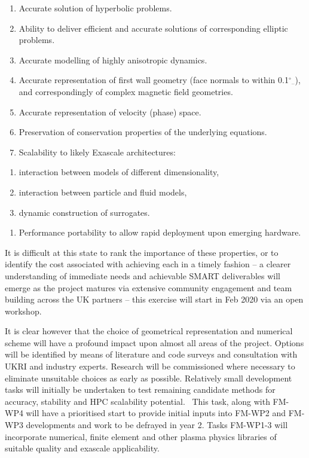 \documentclass[a4paper]{article}
\newcommand\textsubscript[1]{\ensuremath{_{\text{#1}}}}
\newcommand\liststyleWWNumviii{%
\renewcommand\theenumi{\arabic{enumi}}
\renewcommand\theenumii{\arabic{enumii}}
\renewcommand\theenumiii{\arabic{enumiii}}
\renewcommand\theenumiv{\arabic{enumiv}}
\renewcommand\labelenumi{P\theenumi.}
\renewcommand\labelenumii{\theenumii.}
\renewcommand\labelenumiii{\theenumiii.}
\renewcommand\labelenumiv{\theenumiv.}
}
\newcommand\liststyleWWNumxiii{%
\renewcommand\theenumi{\alph{enumi}}
\renewcommand\theenumii{\alph{enumii}}
\renewcommand\theenumiii{\roman{enumiii}}
\renewcommand\theenumiv{\arabic{enumiv}}
\renewcommand\labelenumi{\theenumi.}
\renewcommand\labelenumii{\theenumii.}
\renewcommand\labelenumiii{\theenumiii.}
\renewcommand\labelenumiv{\theenumiv.}
}
\begin{document}
\liststyleWWNumviii
\begin{enumerate}
\item %
Accurate solution of hyperbolic problems.
\item Ability to deliver efficient and accurate solutions of corresponding 
elliptic problems.
\item Accurate modelling of highly anisotropic dynamics. 
\item Accurate representation of first wall geometry (face normals to within 
0.1$^\circ$\textsubscript{--}), and
correspondingly of complex magnetic field geometries.
\item Accurate representation of velocity (phase) space.
\item Preservation of conservation properties of the underlying equations.
\item Scalability to likely Exascale architectures:
\end{enumerate}
\liststyleWWNumxiii
\begin{enumerate}
\item interaction between models of different dimensionality,
\item interaction between particle and fluid models,
\item dynamic construction of surrogates.
\end{enumerate}
\liststyleWWNumviii
\begin{enumerate}
\item Performance portability to allow rapid deployment upon emerging hardware.
\end{enumerate}

\bigskip

It is difficult at this state to rank the importance of these properties, or to 
identify the cost associated with
achieving each in a timely fashion -- a clearer understanding of immediate 
needs and achievable SMART deliverables will
emerge as the project matures via extensive community engagement and team 
building across the UK partners -- this
exercise will start in Feb 2020 via an open workshop. 


\bigskip

It is clear however that the choice of geometrical representation and numerical 
scheme will have a profound impact upon
almost all areas of the project. Options will be identified by means of 
literature and code surveys and consultation
with UKRI and industry experts. Research will be commissioned where necessary 
to eliminate unsuitable choices as early
as possible. Relatively small development tasks will initially be undertaken to 
test remaining candidate methods for
accuracy, stability and HPC scalability potential. \ This task, along with 
FM-WP4 will have a prioritised start to
provide initial inputs into FM-WP2 and FM-WP3 developments and work to be 
defrayed in year 2. Tasks FM-WP1-3 will
incorporate numerical, finite element and other plasma physics libraries of 
suitable quality and exascale
applicability.
\end{document}
